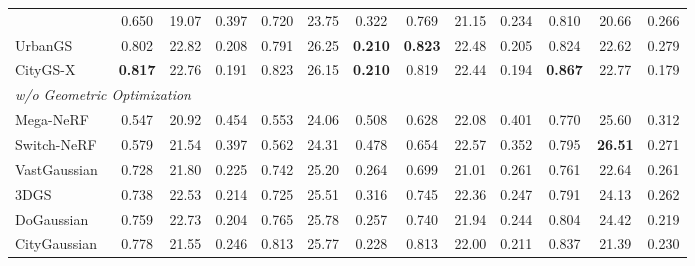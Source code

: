 \documentclass[sigconf]{acmart}
\begin{document}
\begin{table}[t]
{\begin{tabular}{lcccccccccccc}
            & 0.650 & 19.07 & 0.397
            & 0.720 & 23.75 & 0.322
            & 0.769 & 21.15 & 0.234
            & 0.810 & 20.66 & 0.266 \\
        UrbanGS~\cite{urbangs}
            & \cellcolor{tabthird}0.802 & \cellcolor{tabsecond}22.82 & 0.208
            & 0.791 & \cellcolor{tabsecond}26.25 & \cellcolor{tabfirst}\bf 0.210
            & \cellcolor{tabfirst}\bf 0.823 & \cellcolor{tabthird}22.48 & \cellcolor{tabthird}0.205
            & 0.824 & 22.62 & 0.279 \\
        CityGS-X~\cite{gao2025citygsx}
            & \cellcolor{tabfirst}\bf 0.817 & \cellcolor{tabthird}22.76 & \cellcolor{tabsecond}0.191
            & \cellcolor{tabsecond}0.823 & \cellcolor{tabthird}26.15 & \cellcolor{tabfirst}\bf 0.210
            & \cellcolor{tabsecond}0.819 & 22.44 & \cellcolor{tabsecond}0.194
            & \cellcolor{tabfirst}\bf 0.867 & 22.77 & \cellcolor{tabsecond}0.179 \\
        \midrule
        \multicolumn{13}{l}{\textit{w/o Geometric Optimization}} \\
        Mega-NeRF~\cite{turki2022meganerf}
            & 0.547 & 20.92 & 0.454
            & 0.553 & 24.06 & 0.508
            & 0.628 & 22.08 & 0.401
            & 0.770 & \cellcolor{tabsecond}25.60 & 0.312 \\
        Switch-NeRF~\cite{mi2023switchnerf}
            & 0.579 & 21.54 & 0.397
            & 0.562 & 24.31 & 0.478
            & 0.654 & \cellcolor{tabsecond}22.57 & 0.352
            & 0.795 & \cellcolor{tabfirst}\bf 26.51 & 0.271 \\
        VastGaussian~\cite{lin2024vastgaussian}
            & 0.728 & 21.80 & 0.225
            & 0.742 & 25.20 & 0.264
            & 0.699 & 21.01 & 0.261
            & 0.761 & 22.64 & 0.261 \\
        3DGS~\cite{kerbl3Dgaussians}
            & 0.738 & 22.53 & 0.214
            & 0.725 & 25.51 & 0.316
            & 0.745 & 22.36 & 0.247
            & 0.791 & 24.13 & 0.262 \\
        DoGaussian~\cite{chen2024dogs}
            & 0.759 & 22.73 & \cellcolor{tabthird}0.204
            & 0.765 & 25.78 & 0.257
            & 0.740 & 21.94 & 0.244
            & 0.804 & \cellcolor{tabthird}24.42 & \cellcolor{tabthird}0.219 \\
        CityGaussian~\cite{liu2024citygaussian}
            & 0.778 & 21.55 & 0.246
            & \cellcolor{tabthird}0.813 & 25.77 & 0.228
            & \cellcolor{tabthird}0.813 & 22.00 & 0.211
            & \cellcolor{tabthird}0.837 & 21.39 & 0.230 \\

\end{tabular}}
\end{table}
\end{document}

